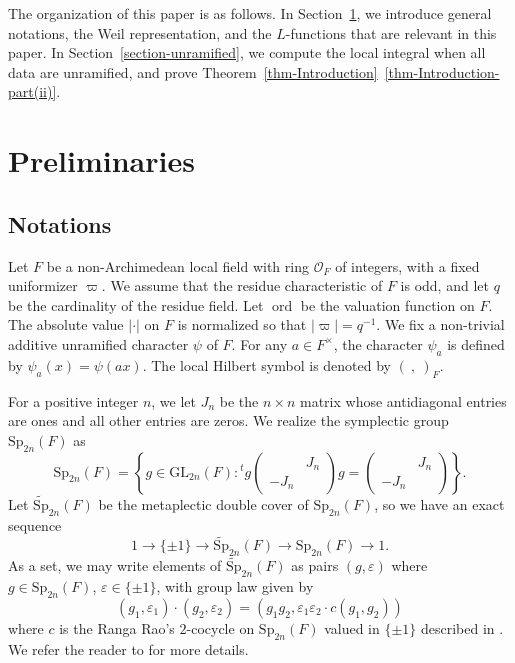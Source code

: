 \documentclass[11pt]{amsart}
\theoremstyle{definition}
\theoremstyle{remark}
\newcommand{\GL}{\mathrm{GL}}
\newcommand{\Sp}{\mathrm{Sp}}
\newcommand{\on}{\operatorname}
\newcommand{\ord}{\on{ord}}
\begin{document}
The organization of this paper is as follows. In Section~\ref{section-preliminaries},  we introduce general notations, the Weil representation, and the $L$-functions that are relevant in this paper. 
In Section~\ref{section-unramified}, we compute the local integral when all data are unramified, and prove Theorem~\ref{thm-Introduction}~\ref{thm-Introduction-part(ii)}.


\section{Preliminaries}
\label{section-preliminaries}
\subsection{Notations}
Let $F$ be a non-Archimedean local field with ring $\mathcal{O}_F$ of integers, with a fixed  uniformizer $\varpi$. 
We assume that the residue characteristic of $F$ is odd, and  let $q$ be the cardinality of the residue field. Let $\ord$ be the valuation function on $F$. The absolute value $|\cdot |$ on $F$ is normalized so that $|\varpi|=q^{-1}$. We fix a  non-trivial additive unramified character $\psi$ of $F$. For any $a\in F^\times$, the character $\psi_a$ is defined by $\psi_a(x)=\psi(ax)$. The local Hilbert symbol is denoted by $(\ , \ )_F$. 
 

For a positive integer $n$, we let $J_n$ be the $n\times n$ matrix
whose antidiagonal entries are ones and all other entries are zeros. We realize the symplectic group $\Sp_{2n}(F)$ as
\begin{equation*}
\Sp_{2n}(F)=\left\{g \in \GL_{2 n}(F) : {}^t g \left(\begin{smallmatrix}
 & J_n\\
 -J_n &
\end{smallmatrix}\right) g=\left(\begin{smallmatrix}
 & J_n\\
 -J_n &
\end{smallmatrix}\right)\right\}.
\end{equation*} 
Let $\widetilde{\mathrm{Sp}}_{2n}(F)$ be the metaplectic double cover of $\mathrm{Sp}_{2n}(F)$, so we have an exact sequence
$$
1  \longrightarrow \{\pm 1\} \longrightarrow \widetilde{\mathrm{Sp}}_{2n}(F)   \longrightarrow \mathrm{Sp}_{2n}(F)   \longrightarrow 1.
$$
As a set, we may write  elements of $\widetilde{\mathrm{Sp}}_{2n}(F)$ as pairs $(g, \varepsilon)$ where $g\in\mathrm{Sp}_{2n}(F)$, $\varepsilon\in \{\pm 1\}$, with group law given by
\begin{equation*}
    (g_1, \varepsilon_1)\cdot (g_2, \varepsilon_2)=(g_1 g_2, \varepsilon_1 \varepsilon_2\cdot c(g_1, g_2) )
\end{equation*}
where $c$ is the Ranga Rao's $2$-cocycle on $\mathrm{Sp}_{2n}(F)$ valued in $\{\pm 1\}$ described in \cite{Rao1993}. 
We refer the reader to \cite{BerndtSchmidt1998} for more details.
\end{document}
